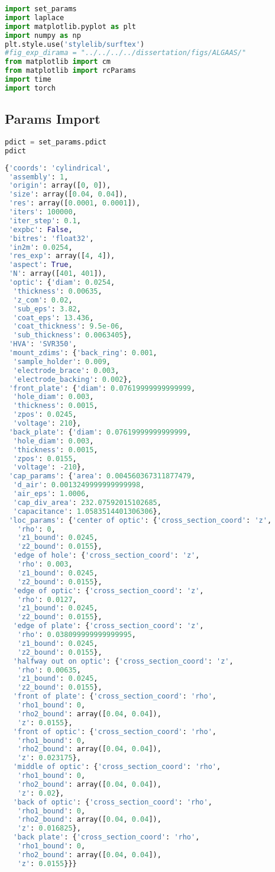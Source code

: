 \begin{lstlisting}[frame=single, language=Python]
import set_params
import laplace
import matplotlib.pyplot as plt
import numpy as np
plt.style.use('stylelib/surftex')
#fig_exp_dirama = "../../../../dissertation/figs/ALGAAS/"
from matplotlib import cm
from matplotlib import rcParams
import time
import torch
\end{lstlisting}

\hypertarget{params-import}{%
\subsection{Params Import}\label{params-import}}

\begin{lstlisting}[frame=single, language=Python]
pdict = set_params.pdict
pdict
\end{lstlisting}

\begin{lstlisting}[frame=single, language=Python]
{'coords': 'cylindrical',
 'assembly': 1,
 'origin': array([0, 0]),
 'size': array([0.04, 0.04]),
 'res': array([0.0001, 0.0001]),
 'iters': 100000,
 'iter_step': 0.1,
 'expbc': False,
 'bitres': 'float32',
 'in2m': 0.0254,
 'res_exp': array([4, 4]),
 'aspect': True,
 'N': array([401, 401]),
 'optic': {'diam': 0.0254,
  'thickness': 0.00635,
  'z_com': 0.02,
  'sub_eps': 3.82,
  'coat_eps': 13.436,
  'coat_thickness': 9.5e-06,
  'sub_thickness': 0.0063405},
 'HVA': 'SVR350',
 'mount_zdims': {'back_ring': 0.001,
  'sample_holder': 0.009,
  'electrode_brace': 0.003,
  'electrode_backing': 0.002},
 'front_plate': {'diam': 0.07619999999999999,
  'hole_diam': 0.003,
  'thickness': 0.0015,
  'zpos': 0.0245,
  'voltage': 210},
 'back_plate': {'diam': 0.07619999999999999,
  'hole_diam': 0.003,
  'thickness': 0.0015,
  'zpos': 0.0155,
  'voltage': -210},
 'cap_params': {'area': 0.004560367311877479,
  'd_air': 0.0013249999999999998,
  'air_eps': 1.0006,
  'cap_div_area': 232.07592015102685,
  'capacitance': 1.0583514401306306},
 'loc_params': {'center of optic': {'cross_section_coord': 'z',
   'rho': 0,
   'z1_bound': 0.0245,
   'z2_bound': 0.0155},
  'edge of hole': {'cross_section_coord': 'z',
   'rho': 0.003,
   'z1_bound': 0.0245,
   'z2_bound': 0.0155},
  'edge of optic': {'cross_section_coord': 'z',
   'rho': 0.0127,
   'z1_bound': 0.0245,
   'z2_bound': 0.0155},
  'edge of plate': {'cross_section_coord': 'z',
   'rho': 0.038099999999999995,
   'z1_bound': 0.0245,
   'z2_bound': 0.0155},
  'halfway out on optic': {'cross_section_coord': 'z',
   'rho': 0.00635,
   'z1_bound': 0.0245,
   'z2_bound': 0.0155},
  'front of plate': {'cross_section_coord': 'rho',
   'rho1_bound': 0,
   'rho2_bound': array([0.04, 0.04]),
   'z': 0.0155},
  'front of optic': {'cross_section_coord': 'rho',
   'rho1_bound': 0,
   'rho2_bound': array([0.04, 0.04]),
   'z': 0.023175},
  'middle of optic': {'cross_section_coord': 'rho',
   'rho1_bound': 0,
   'rho2_bound': array([0.04, 0.04]),
   'z': 0.02},
  'back of optic': {'cross_section_coord': 'rho',
   'rho1_bound': 0,
   'rho2_bound': array([0.04, 0.04]),
   'z': 0.016825},
  'back plate': {'cross_section_coord': 'rho',
   'rho1_bound': 0,
   'rho2_bound': array([0.04, 0.04]),
   'z': 0.0155}}}
\end{lstlisting}

